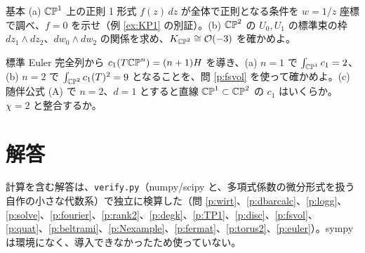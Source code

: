 \begin{prob}{基本}\label{p:Kcp}
(a) $\mathbb{CP}^1$ 上の正則 1 形式 $f(z)\,dz$ が全体で正則となる条件を $w=1/z$ 座標で調べ、$f=0$ を示せ（例 \ref{ex:KP1} の別証）。(b) $\mathbb{CP}^2$ の $U_0,U_1$ の標準束の枠 $dz_1\wedge dz_2$、$dw_0\wedge dw_2$ の関係を求め、$K_{\mathbb{CP}^2}\cong\mathcal O(-3)$ を確かめよ。
\end{prob}
\begin{prob}{標準}\label{p:euler}
Euler 完全列から $c_1(T\mathbb{CP}^n)=(n+1)H$ を導き、(a) $n=1$ で $\int_{\mathbb{CP}^1}c_1=2$、(b) $n=2$ で $\int_{\mathbb{CP}^2}c_1(T)^2=9$ となることを、問 \ref{p:fsvol} を使って確かめよ。(c) 随伴公式 (A) で $n=2$、$d=1$ とすると直線 $\mathbb{CP}^1\subset\mathbb{CP}^2$ の $c_1$ はいくらか。$\chi=2$ と整合するか。
\end{prob}

\section*{解答}
計算を含む解答は、\texttt{verify.py}（numpy/scipy と、多項式係数の微分形式を扱う自作の小さな代数系）で独立に検算した（問 \ref{p:wirt}、\ref{p:dbarcalc}、\ref{p:logg}、\ref{p:solve}、\ref{p:fourier}、\ref{p:rank2}、\ref{p:degk}、\ref{p:TP1}、\ref{p:disc}、\ref{p:fsvol}、\ref{p:quat}、\ref{p:beltrami}、\ref{p:Nexample}、\ref{p:fermat}、\ref{p:torus2}、\ref{p:euler}）。sympy は環境になく、導入できなかったため使っていない。

